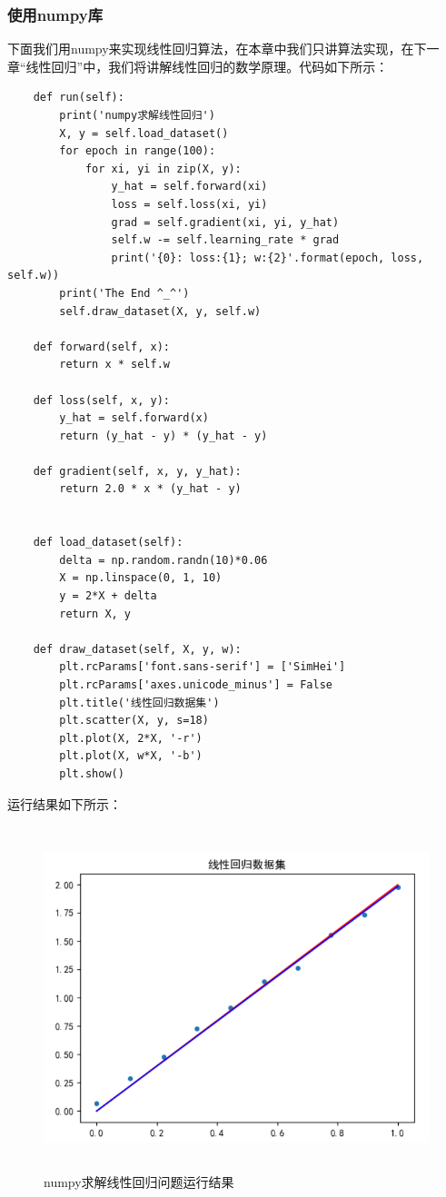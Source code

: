 \documentclass[UTF8]{article}
\begin{document}
\subsubsection{使用numpy库}
下面我们用numpy来实现线性回归算法，在本章中我们只讲算法实现，在下一章“线性回归”中，我们将讲解线性回归的数学原理。代码如下所示：
\begin{lstlisting}
    def run(self):
        print('numpy求解线性回归')
        X, y = self.load_dataset()
        for epoch in range(100):
            for xi, yi in zip(X, y):
                y_hat = self.forward(xi)
                loss = self.loss(xi, yi)
                grad = self.gradient(xi, yi, y_hat)
                self.w -= self.learning_rate * grad
                print('{0}: loss:{1}; w:{2}'.format(epoch, loss, self.w))
        print('The End ^_^')
        self.draw_dataset(X, y, self.w)

    def forward(self, x):
        return x * self.w
    
    def loss(self, x, y):
        y_hat = self.forward(x)
        return (y_hat - y) * (y_hat - y)

    def gradient(self, x, y, y_hat):
        return 2.0 * x * (y_hat - y)


    def load_dataset(self):
        delta = np.random.randn(10)*0.06
        X = np.linspace(0, 1, 10)
        y = 2*X + delta
        return X, y

    def draw_dataset(self, X, y, w):
        plt.rcParams['font.sans-serif'] = ['SimHei']
        plt.rcParams['axes.unicode_minus'] = False
        plt.title('线性回归数据集')
        plt.scatter(X, y, s=18)
        plt.plot(X, 2*X, '-r')
        plt.plot(X, w*X, '-b')
        plt.show()
\end{lstlisting}
运行结果如下所示：
\begin{figure}[H]
	\caption{numpy求解线性回归问题运行结果}
	\label{f000012}
	\centering
	\includegraphics[height=10cm]{images/f000012}
\end{figure}
\end{document}
